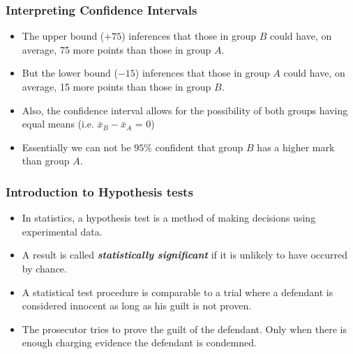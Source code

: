﻿\documentclass[a4]{beamer}
\begin{document}
\begin{frame}
\frametitle{Interpreting Confidence Intervals}
\begin{itemize}
\item The upper bound ($+75$) inferences that those in group $B$ could have, on average, 75 more points than those in group $A$.
\item But the lower bound ($-15$) inferences that those in group $A$ could have, on average, 15 more points than those in group $B$.
\item Also, the confidence interval allows for the possibility of both groups having equal means  (i.e. $\bar{x}_B-\bar{x}_A$ = 0)
\item Essentially we can not be $95\%$ confident that group $B$ has a higher mark than group $A$.
\end{itemize}
\end{frame}




\begin{frame}
\frametitle{Introduction to Hypothesis tests}
\large
\begin{itemize} \item
In statistics, a  hypothesis test is a method of making decisions using experimental data. \item A result is called \textbf{\emph{statistically significant}} if it is unlikely to have occurred by chance. \item A statistical test procedure is comparable to a trial where a defendant is considered innocent as long as his guilt is not proven.\item  The prosecutor tries to prove the guilt of the defendant. Only when there is enough charging evidence the defendant is condemned.
\end{itemize}

\end{frame}
\end{document}
